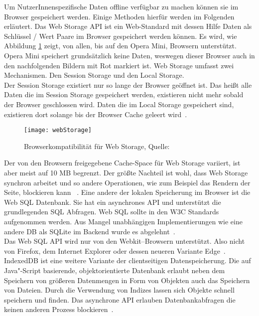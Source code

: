 Um NutzerInnenspezifische Daten offline verfügbar zu machen können sie im Browser gespeichert werden. Einige Methoden hierfür werden im Folgenden erläutert.
%
Das Web Storage \gls{API} ist ein Web-Standard mit dessen Hilfe Daten als Schlüssel / Wert Paare im Browser gespeichert werden können. Es wird, wie Abbildung \ref{fig:webStorage} zeigt, von allen, bis auf den Opera Mini,  Browsern unterstützt. Opera Mini speichert grundsätzlich keine Daten, weswegen dieser Browser auch in den nachfolgenden Bildern mit Rot markiert ist.
Web Storage umfasst zwei Mechanismen. Den Session Storage und den Local Storage.\\
Der Session Storage existiert nur so lange der Browser geöffnet ist.
Das heißt alle Daten die im Session Storage gespeichert werden, existieren nicht mehr sobald der Browser geschlossen wird. Daten die im Local Storage gespeichert sind, existieren dort solange bis der Browser Cache geleert wird~\cite{webstorage}.
\begin{figure}[H]
	\centering
	\texttt{[image: webStorage]}
	\grayRule
	\caption[Browserkompatibilität für Web Storage]{Browserkompatibilität für Web Storage, Quelle: ~\cite{caniuse-ws}}
	\label{fig:webStorage}
\end{figure}
Der von den Browsern freigegebene Cache-Space für Web Storage variiert, ist aber meist auf 10 MB begrenzt. Der größte Nachteil ist wohl, dass Web Storage synchron arbeitet und so andere Operationen, wie zum Beispiel das Rendern der Seite, blockieren kann ~\cite{webstorage-con}.
%
%
Eine andere der lokalen Speicherung im Browser ist die Web SQL Datenbank.
Sie hat ein asynchrones \gls{API} und unterstützt die grundlegenden SQL Abfragen. Web SQL sollte in den W3C Standards aufgenommen werden. Aus Mangel unabhängigen Implementierungen wie eine andere \gls{DB} als SQLite im Backend wurde es abgelehnt~\cite{websql}.\\
Das Web SQL \gls{API} wird nur von den Webkit--Browsern unterstützt. Also nicht von Firefox, dem Internet Explorer oder dessen neueren Variante Edge~\cite{caniuse-websql}.
%
%
IndexedDB ist eine weitere Variante der clientseitigen Datenspeicherung. Die auf Java"-Script basierende, objektorientierte Datenbank erlaubt neben dem Speichern von größeren Datenmengen in Form von Objekten auch das Speichern von Dateien. Durch die Verwendung von Indizes lassen sich Objekte schnell speichern und finden. Das asynchrone \gls{API} erlauben Datenbankabfragen die keinen anderen Prozess blockieren~\cite{idb}.
